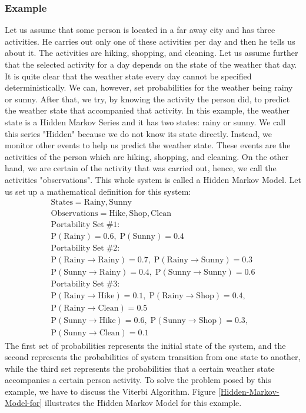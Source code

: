 \documentclass{acm_proc_article-sp}
\begin{document}
\subsubsection{Example}\label{Example}
Let us assume that some person is located in a far away city and has three activities. He carries out only one of these activities per day and then he tells us about it. The activities are hiking, shopping, and cleaning. Let us assume further that the selected activity for a day depends on the state of the weather that day. It is quite clear that the weather state every day cannot be specified deterministically. We can, however, set probabilities for the weather being rainy or sunny. After that, we try, by knowing the activity the person did, to predict the weather state that accompanied that activity. In this example, the weather state is a Hidden Markov Series and it has two states: rainy or sunny. We call this series "Hidden" because we do not know its state directly. Instead, we monitor other events to help us predict the weather state. These events are the activities of the person which are hiking, shopping, and cleaning. On the other hand, we are certain of the activity that was carried out, hence, we call the activities "observations". This whole system is called a Hidden Markov Model. Let us set up a mathematical definition for this system:
\begin{equation*}
    \begin{array}{l}
    \mathrm{States={Rainy,Sunny}}\\
    \mathrm{Observations={Hike,Shop,Clean}}\\
    \mathrm{Portability\; Set\;\#1:}\\
    \mathrm{P(Rainy)=0.6,\;P(Sunny)=0.4}\\
    \mathrm{Portability\; Set\;\#2:}\\
    \mathrm{P(Rainy\rightarrow Rainy)=0.7,\;P(Rainy\rightarrow Sunny)=0.3}\\
    \mathrm{P(Sunny\rightarrow Rainy)=0.4,\;P(Sunny\rightarrow Sunny)=0.6}\\
    \mathrm{Portability\; Set\;\#3:}\\
    \mathrm{P(Rainy\rightarrow Hike)=0.1,\;P(Rainy\rightarrow Shop)=0.4,}\\
    \mathrm{P(Rainy\rightarrow Clean)=0.5}\\
    \mathrm{P(Sunny\rightarrow Hike)=0.6,\;P(Sunny\rightarrow Shop)=0.3,}\\
    \mathrm{P(Sunny\rightarrow Clean)=0.1}
    \end{array}
\end{equation*}
The first set of probabilities represents the initial state of the system, and the second represents the probabilities of system transition from one state to another, while the third set represents the probabilities that a certain weather state accompanies a certain person activity. To solve the problem posed by this example, we have to discuss the Viterbi Algorithm. Figure \ref{Hidden-Markov-Model-for} illustrates the Hidden Markov Model for this example.
\end{document}
